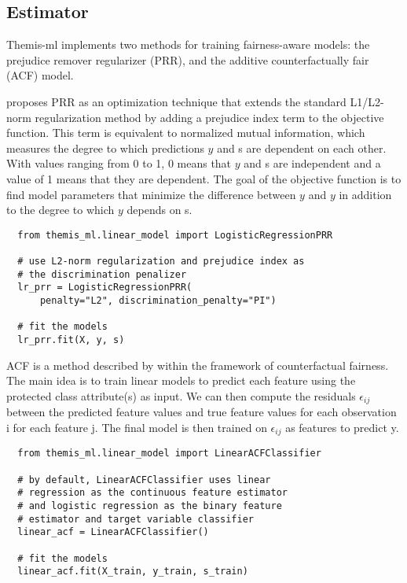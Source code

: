 \documentclass{acm_proc_article-sp}
\begin{document}
\subsection{Estimator}

Themis-ml implements two methods for training fairness-aware models: the
prejudice remover regularizer (PRR), and the additive counterfactually fair
(ACF) model.

\cite{kamishima2012fairness} proposes PRR as an optimization technique that
extends the standard L1/L2-norm regularization method \cite{ng2004feature,
ribeiro2016should} by adding a prejudice index term to the objective function.
This term is equivalent to normalized mutual information, which measures the
degree to which predictions \(y\) and s are dependent on each other. With values
ranging from 0 to 1, 0 means that \(y\) and s are independent and a value of 1
means that they are dependent. The goal of the objective function is to find
model parameters that minimize the difference between \(y\) and \(y\) in
addition to the degree to which \(y\) depends on s.

\begin{verbatim}
  from themis_ml.linear_model import LogisticRegressionPRR

  # use L2-norm regularization and prejudice index as
  # the discrimination penalizer
  lr_prr = LogisticRegressionPRR(
      penalty="L2", discrimination_penalty="PI")

  # fit the models
  lr_prr.fit(X, y, s)
\end{verbatim}

ACF is a method described by \cite{kusner2017counterfactual} within the
framework of counterfactual fairness. The main idea is to train linear models to
predict each feature using the protected class attribute(s) as input. We can
then compute the residuals \(\epsilon_{ij}\) between the predicted feature
values and true feature values for each observation i for each feature j. The
final model is then trained on \(\epsilon_{ij}\) as features to predict y.

\begin{verbatim}
  from themis_ml.linear_model import LinearACFClassifier

  # by default, LinearACFClassifier uses linear
  # regression as the continuous feature estimator
  # and logistic regression as the binary feature
  # estimator and target variable classifier
  linear_acf = LinearACFClassifier()

  # fit the models
  linear_acf.fit(X_train, y_train, s_train)
\end{verbatim}
\end{document}
